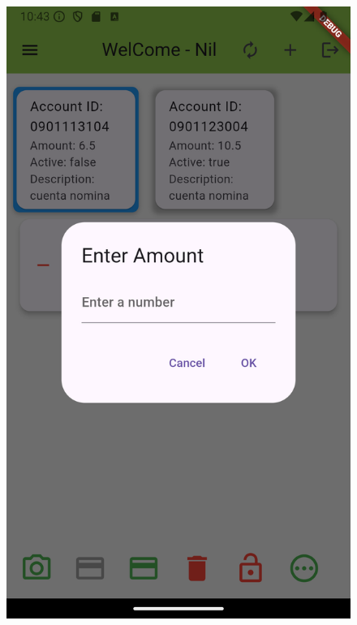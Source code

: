\documentclass[a4paper,12pt,twoside]{ThesisStyle}
\begin{document}
\begin{figure}[h]
\begin{minipage}{0.30\textwidth}
        \includegraphics[width=\textwidth]{imatges/otherOperation2.png}
    \end{minipage}
    \begin{minipage}{0.30\textwidth}
        \centering

\end{minipage}
\end{figure}
\end{document}
